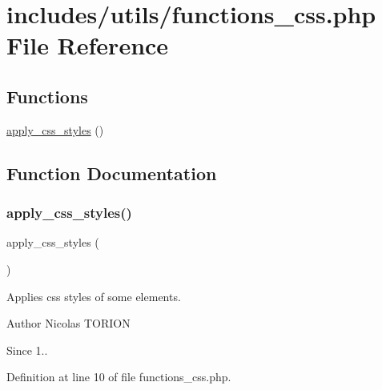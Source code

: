 \hypertarget{functions__css_8php}{}\section{includes/utils/functions\+\_\+css.php File Reference}
\label{functions__css_8php}
\subsection*{Functions}
\begin{DoxyCompactItemize}
\item 
\hyperlink{functions__css_8php_ad4c715d0a5b7732a18cbeee26940c389}{apply\+\_\+css\+\_\+styles} ()
\end{DoxyCompactItemize}


\subsection{Function Documentation}
\mbox{\label{functions__css_8php_ad4c715d0a5b7732a18cbeee26940c389}} 
\subsubsection{\texorpdfstring{apply\+\_\+css\+\_\+styles()}{apply\_css\_styles()}}
{\footnotesize\ttfamily apply\+\_\+css\+\_\+styles (\begin{DoxyParamCaption}{ }\end{DoxyParamCaption})}

Applies css styles of some elements.

\begin{DoxyAuthor}{Author}
Nicolas T\+O\+R\+I\+ON 
\end{DoxyAuthor}
\begin{DoxySince}{Since}
1.. 
\end{DoxySince}


Definition at line 10 of file functions\+\_\+css.\+php.

